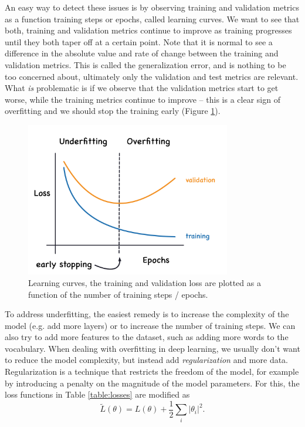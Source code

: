 An easy way to detect these issues is by observing training and validation metrics as a function training steps or epochs, called learning curves.
We want to see that both, training and validation metrics continue to improve as training progresses until they both taper off at a certain point.
Note that it is normal to see a difference in the absolute value and rate of change between the training and validation metrics.
This is called the generalization error, and is nothing to be too concerned about, ultimately only the validation and test metrics are relevant.
What \textit{is} problematic is if we observe that the validation metrics start to get worse, while the training metrics continue to improve -- this is a clear sign of overfitting and we should stop the training early (Figure \ref{fig:learning_curves}).
\begin{figure}
    \centering
    \includegraphics[width=0.8\textwidth]{chapters/NLP/figures/learning_curves.png}
    \caption{Learning curves, the training and validation loss are plotted as a function of the number of training steps / epochs.}
    \label{fig:learning_curves}
\end{figure}
To address underfitting, the easiest remedy is to increase the complexity of the model (e.g. add more layers) or to increase the number of training steps.
We can also try to add more features to the dataset, such as adding more words to the vocabulary.
When dealing with overfitting in deep learning, we usually don't want to reduce the model complexity, but instead add \textit{regularization} and more data.
Regularization is a technique that restricts the freedom of the model, for example by introducing a penalty on the magnitude of the model parameters.
For this, the loss functions in Table \ref{table:losses} are modified as
\begin{equation}
    \tilde{L}(\theta) = L(\theta) + \frac{1}{2} \sum_{i} |\theta_i|^2.
\end{equation}

